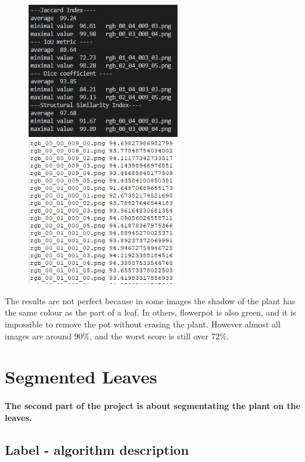 \documentclass[12pt]{article}
\begin{document}
\begin{center}
\begin{figure}[h!]
\centering
\includegraphics[width = 2.6in]{MaskResult.png}
\hspace{1cm}
\includegraphics[width = 2.6in]{MaskResult1.png}
\end{figure}
\end{center}

The results are not perfect because in some images the shadow of the plant has the same colour as the part of a leaf. In others,
flowerpot is also green, and it is impossible to remove the pot without erasing the plant. However almost all images are around 90\%, and the worst score is still over 72\%.

\newpage

\section{Segmented Leaves}

\paragraph{
The second part of the project is about segmentating the plant on the leaves.
}

\subsection{Label - algorithm description}
\end{document}
